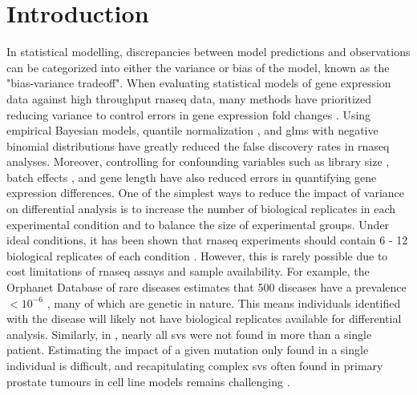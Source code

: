 \section{Introduction}

In statistical modelling, discrepancies between model predictions and observations can be categorized into either the variance or bias of the model, known as the "bias-variance tradeoff".
When evaluating statistical models of gene expression data against high throughput \gls{rnaseq} data, many methods have prioritized reducing variance to control errors in gene expression fold changes \cite{robinsonEdgeRBioconductorPackage2010,loveModeratedEstimationFold2014,hansenRemovingTechnicalVariability2012,trapnellDifferentialAnalysisGene2013,liRSEMAccurateTranscript2011,hardcastleBaySeqEmpiricalBayesian2010,ritchieLimmaPowersDifferential2015,lawVoomPrecisionWeights2014,lengEBSeqEmpiricalBayes2013,liModelingAnalysisRNAseq2018,rissoNormalizationRNAseqData2014,bullardEvaluationStatisticalMethods2010,pimentelDifferentialAnalysisRNAseq2017,yiGenelevelDifferentialAnalysis2018}.
Using empirical Bayesian \cite{hardcastleBaySeqEmpiricalBayesian2010,lengEBSeqEmpiricalBayes2013} models, quantile normalization \cite{hansenRemovingTechnicalVariability2012}, and \glspl{glm} with negative binomial distributions have greatly reduced the false discovery rates in \gls{rnaseq} analyses.
Moreover, controlling for confounding variables such as library size \cite{bullardEvaluationStatisticalMethods2010}, batch effects \cite{leekSvaPackageRemoving2012}, and gene length \cite{bullardEvaluationStatisticalMethods2010,loveModeratedEstimationFold2014,robinsonEdgeRBioconductorPackage2010,oshlackTranscriptLengthBias2009} have also reduced errors in quantifying gene expression differences.
One of the simplest ways to reduce the impact of variance on differential analysis is to increase the number of biological replicates in each experimental condition and to  balance the size of experimental groups.
Under ideal conditions, it has been shown that \gls{rnaseq} experiments should contain 6 - 12 biological replicates of each condition \cite{schurchHowManyBiological2016}.
However, this is rarely possible due to cost limitations of \gls{rnaseq} assays and sample availability.
For example, the Orphanet Database of rare diseases estimates that  500 diseases have a prevalence $< 10^{-6}$ \cite{nguengangwakapEstimatingCumulativePoint2020}, many of which are genetic in nature.
This means individuals identified with the disease will likely not have biological replicates available for differential analysis.
Similarly, in , nearly all \glspl{sv} were not found in more than a single patient.
Estimating the impact of a given mutation only found in a single individual is difficult, and recapitulating complex \glspl{sv} often found in primary prostate tumours in cell line models remains challenging \cite{nakamuraCRISPRTechnologiesPrecise2021,pickar-oliverNextGenerationCRISPR2019,wangEngineering3DGenome2021}.


